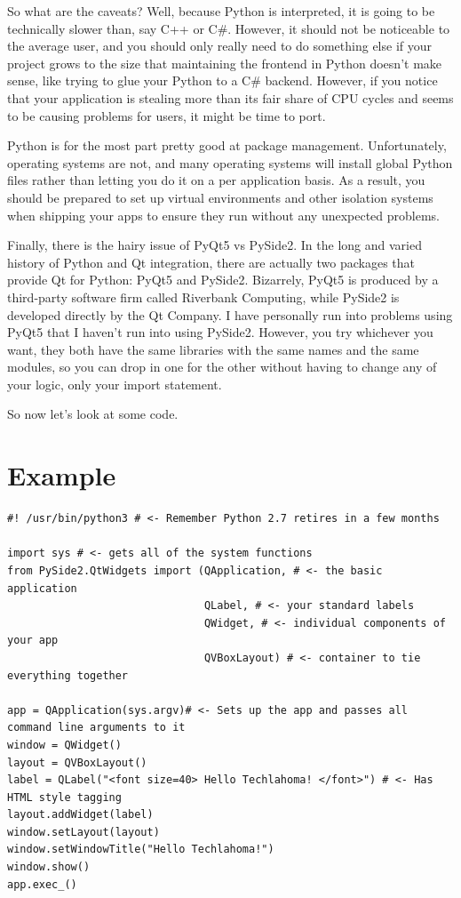 \documentclass[11pt]{article}
\begin{document}
\begin{notes}
So what are the caveats? Well, because Python is interpreted, it is going to be technically slower than, say C++ or C\#. However, it should not be noticeable to the average user, and you should only really need to do something else if your project grows to the size that maintaining the frontend in Python doesn't make sense, like trying to glue your Python to a C\# backend. However, if you notice that your application is stealing more than its fair share of CPU cycles and seems to be causing problems for users, it might be time to port.

Python is for the most part pretty good at package management. Unfortunately, operating systems are not, and many operating systems will install global Python files rather than letting you do it on a per application basis. As a result, you should be prepared to set up virtual environments and other isolation systems when shipping your apps to ensure they run without any unexpected problems.

Finally, there is the hairy issue of PyQt5 vs PySide2. In the long and varied history of Python and Qt integration, there are actually two packages that provide Qt for Python: PyQt5 and PySide2. Bizarrely, PyQt5 is produced by a third-party software firm called Riverbank Computing, while PySide2 is developed directly by the Qt Company. I have personally run into problems using PyQt5 that I haven't run into using PySide2. However, you try whichever you want, they both have the same libraries with the same names and the same modules, so you can drop in one for the other without having to change any of your logic, only your import statement.

So now let's look at some code.
\end{notes}

\section{Example}
\label{sec:orgf3671bc}
\begin{verbatim}
#! /usr/bin/python3 # <- Remember Python 2.7 retires in a few months

import sys # <- gets all of the system functions
from PySide2.QtWidgets import (QApplication, # <- the basic application
                               QLabel, # <- your standard labels
                               QWidget, # <- individual components of your app
                               QVBoxLayout) # <- container to tie everything together

app = QApplication(sys.argv)# <- Sets up the app and passes all command line arguments to it
window = QWidget()
layout = QVBoxLayout()
label = QLabel("<font size=40> Hello Techlahoma! </font>") # <- Has HTML style tagging
layout.addWidget(label)
window.setLayout(layout)
window.setWindowTitle("Hello Techlahoma!")
window.show()
app.exec_()
\end{verbatim}
\end{document}
